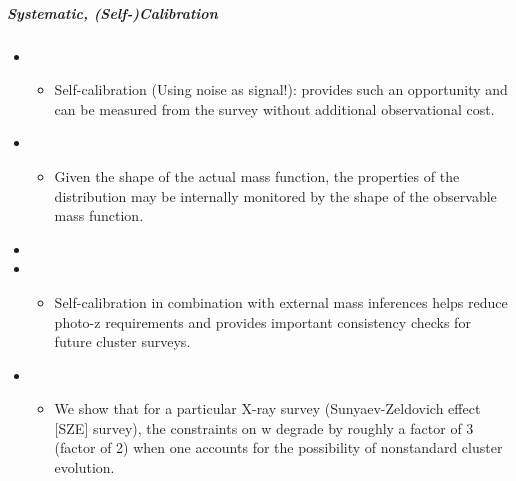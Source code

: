 \documentclass[letterpaper,10pt,english]{sphinxmanual}
\begin{document}
\subparagraph{Systematic, (Self-)Calibration}
\label{\detokenize{resource/astro/reference/cluster_cosmology:systematic-self-calibration}}\begin{itemize}
\item {} 
\begin{itemize}
\item {} 
 Self-calibration (Using noise as signal!): 
provides such an opportunity and can be measured from the survey
without additional observational cost.

\end{itemize}

\item {} 
\begin{itemize}
\item {} 
Given the shape of the actual mass function, the properties of the
distribution may be internally monitored by the shape of the
observable mass function.

\end{itemize}

\item {} 

\item {} 
\begin{itemize}
\item {} 
Self-calibration in combination with external mass inferences
helps reduce photo-z requirements and provides important
consistency checks for future cluster surveys.

\end{itemize}

\item {} 
\begin{itemize}
\item {} 
We show that for a particular X-ray survey (Sunyaev-Zeldovich
effect {[}SZE{]} survey), the constraints on w degrade by roughly a
factor of 3 (factor of 2) when one accounts for the possibility of
nonstandard cluster evolution.


\end{itemize}
\end{itemize}
\end{document}
